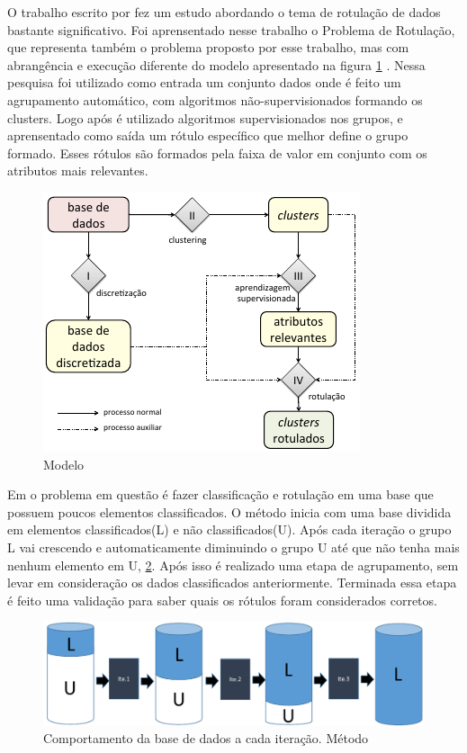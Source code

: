 O trabalho escrito por \cite{Lopes} fez um estudo abordando o tema de rotulação de dados bastante significativo. Foi aprensentado nesse trabalho o Problema de Rotulação, que representa também o problema proposto por esse trabalho, mas com abrangência e execução diferente do modelo apresentado na figura \ref{fig:modeloLOPES} . Nessa pesquisa foi utilizado como entrada um conjunto  dados onde é feito um agrupamento automático, com algoritmos não-supervisionados formando os clusters. Logo após é utilizado algoritmos supervisionados nos grupos, e aprensentado como saída um rótulo específico que melhor define o grupo formado. Esses rótulos são formados pela faixa de valor em conjunto com os atributos mais relevantes.

\begin{figure}[h]
        \centering
        \includegraphics[scale=0.8]{figs/modeloLopes.png}
        \caption{Modelo \cite{Lopes}} 
        \label{fig:modeloLOPES}
\end{figure}


Em \cite{Metodo2015} o problema em questão é fazer classificação e rotulação em uma base que possuem poucos elementos classificados. O método inicia com uma base dividida em elementos classificados(L) e não classificados(U). Após cada iteração o grupo L vai crescendo e automaticamente diminuindo o grupo U até que não tenha mais nenhum elemento em U, \ref{fig:modeloVicente}. Após isso é realizado uma etapa de agrupamento, sem levar em consideração os dados classificados anteriormente. Terminada essa etapa é feito uma validação para saber quais os rótulos foram considerados corretos.
\begin{figure}[!h]
        \centering
        \includegraphics[scale=0.4]{figs/modeloVicente.png}
        \caption{Comportamento da base de dados a cada iteração. Método \cite{Filho2015}} \label{fig:modeloVicente}
\end{figure}

